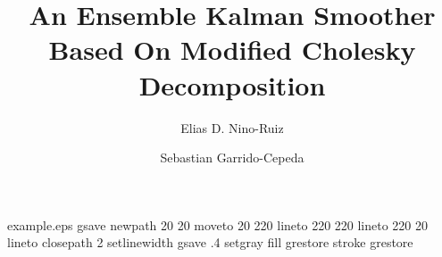 %
%
%
%
%
\begin{filecontents*}{example.eps}
gsave
newpath
  20 20 moveto
  20 220 lineto
  220 220 lineto
  220 20 lineto
closepath
2 setlinewidth
gsave
  .4 setgray fill
grestore
stroke
grestore
\end{filecontents*}
%
\RequirePackage{fix-cm}
%
\documentclass[smallextended]{svjour3}       %
%
\smartqed  %
%
\usepackage{graphicx}


%
%
%
%
%


\title{An Ensemble Kalman Smoother Based On Modified Cholesky Decomposition%
}


\author{Elias D. Nino-Ruiz \and Sebastian Garrido-Cepeda %
}

